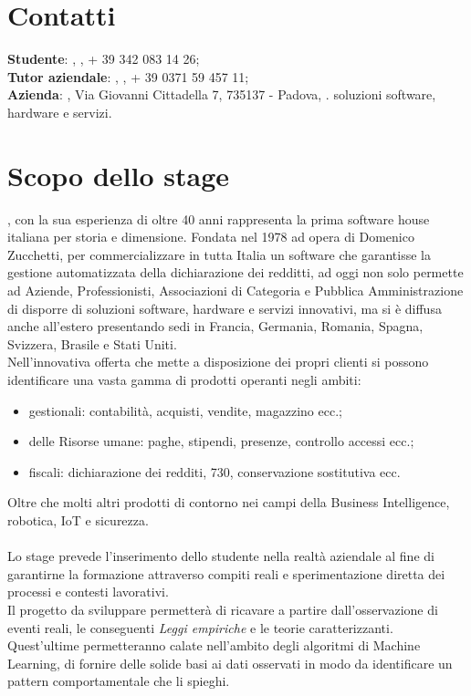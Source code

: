 \section{Contatti}
\textbf{Studente}: \myName, , + 39 342 083 14 26;\\
\textbf{Tutor aziendale}: \Greg, , + 39 0371 59 457 11;\\
\textbf{Azienda}: \myCompany, Via Giovanni Cittadella 7, 735137 - Padova, \sitoCompany.
soluzioni software, hardware e servizi. 

\section{Scopo dello stage}
\textit{\myCompany}, con la sua esperienza di oltre 40 anni rappresenta la prima software house italiana per storia e dimensione. Fondata nel 1978 ad opera di Domenico Zucchetti, per commercializzare in tutta Italia un software che garantisse la gestione automatizzata della dichiarazione dei redditti, ad oggi non solo permette ad Aziende, Professionisti, Associazioni di Categoria e Pubblica Amministrazione di disporre di  soluzioni software, hardware e servizi innovativi, ma si è diffusa anche all'estero presentando sedi in Francia, Germania, Romania, Spagna, Svizzera, Brasile e Stati Uniti.\\ Nell'innovativa offerta che \textit{\myCompany{}} mette a disposizione dei propri clienti si possono identificare una vasta gamma di prodotti operanti negli ambiti:
\begin{itemize}
\item gestionali: contabilità, acquisti, vendite, magazzino ecc.;
\item delle Risorse umane: paghe, stipendi, presenze, controllo accessi ecc.;
\item fiscali: dichiarazione dei redditi, 730, conservazione sostitutiva ecc.
\end{itemize}
Oltre che molti altri prodotti di contorno nei campi della Business Intelligence, robotica, IoT e  sicurezza.
\\\\
Lo stage prevede l'inserimento dello studente nella realtà aziendale al fine di garantirne la formazione attraverso compiti reali e sperimentazione diretta dei processi e contesti lavorativi. \\
Il progetto da sviluppare permetterà di ricavare a partire dall'osservazione di eventi reali, le conseguenti \textit{Leggi empiriche} e le teorie caratterizzanti. Quest'ultime permetteranno calate nell'ambito degli algoritmi di Machine Learning, di fornire delle solide basi ai dati osservati in modo da identificare un pattern comportamentale che li spieghi. 
